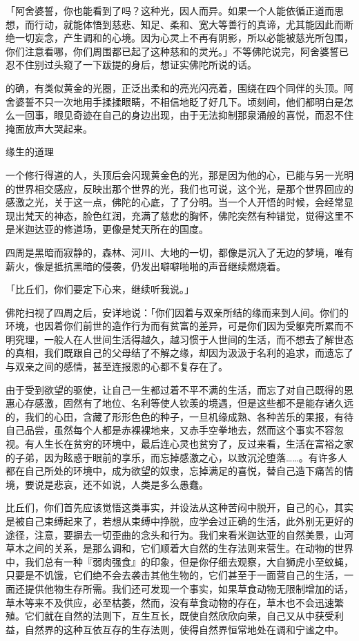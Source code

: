 \documentclass[12pt,twoside,openany]{book}
\begin{document}
「阿舍婆誓，你也能看到了吗？这种光，因人而异。如果一个人能依循正道而思想，而行动，就能体悟到慈悲、知足、柔和、宽大等善行的真谛，尤其能因此而断绝一切妄念，产生调和的心境。因为心灵上不再有阴影，所以必能被慈光所包围，你们注意看哪，你们周围都已起了这种慈和的灵光。」不等佛陀说完，阿舍婆誓已忍不住别过头窥了一下跋提的身后，想证实佛陀所说的话。

的确，有类似黄金的光圈，正泛出柔和的亮光闪亮着，围绕在四个同伴的头顶。阿舍婆誓不只一次地用手揉揉眼睛，不相信地眨了好几下。顷刻间，他们都明白是怎么一回事，眼见奇迹在自己的身边出现，由于无法抑制那泉涌般的喜悦，而忍不住掩面放声大哭起来。

缘生的道理

一个修行得道的人，头顶后会闪现黄金色的光，那是因为他的心，已能与另一光明的世界相交感应，反映出那个世界的光，我们也可说，这个光，是那个世界回应的感激之光，关于这一点，佛陀的心底，了了分明。当一个人开悟的时候，会经常显现出梵天的神态，脸色红润，充满了慈悲的胸怀，佛陀突然有种错觉，觉得这里不是米迦达亚的修道场，更像是梵天所在的国度。

四周是黑暗而寂静的，森林、河川、大地的一切，都像是沉入了无边的梦境，唯有薪火，像是抵抗黑暗的侵袭，仍发出噼噼啪啪的声音继续燃烧着。

「比丘们，你们要定下心来，继续听我说。」

佛陀扫视了四周之后，安详地说：「你们因着与双亲所结的缘而来到人间。你们的环境，也因着你们前世的造作行为而有贫富的差异，可是你们因为受躯壳所累而不明究理，一般人在人世间生活得越久，越习惯于人世间的生活，而不想去了解世态的真相，我们既跟自己的父母结了不解之缘，却因为汲汲于名利的追求，而遗忘了与双亲之间的感情，甚至连报恩的心都不复存在了。

由于受到欲望的驱使，让自己一生都过着不平不满的生活，而忘了对自己既得的恩惠心存感激，固然有了地位、名利等使人钦羡的境遇，但是这些都不是能存诸久远的，我们的心田，含藏了形形色色的种子，一旦机缘成熟、各种苦乐的果报，有待自己品尝，虽然每个人都是赤裸裸地来，又赤手空拳地去，然而这个事实不容忽视。有人生长在贫穷的环境中，最后连心灵也贫穷了，反过来看，生活在富裕之家的子弟，因为眩惑于眼前的享乐，而忘掉感激之心，以致沉沦堕落……。有许多人都在自己所处的环境中，成为欲望的奴隶，忘掉满足的喜悦，替自己造下痛苦的情境，要说是悲哀，还不如说，人类是多么愚蠢。

比丘们，你们首先应该觉悟这类事实，并设法从这种苦闷中脱开，自己的心，其实是被自己束缚起来了，若想从束缚中挣脱，应学会过正确的生活，此外别无更好的途径，注意，要摒去一切歪曲的念头和行为。我们来看米迦达亚的自然美景，山河草木之间的关系，是那么调和，它们顺着大自然的生存法则来营生。在动物的世界中，我们总有一种『弱肉强食』的印象，但是你仔细去观察，大自狮虎小至蚊蝇，只要是不饥饿，它们绝不会去袭击其他生物的，它们甚至于一面营自己的生活，一面还提供他物生存所需。我们还可发现一个事实，如果草食动物无限制增加的话，草木等来不及供应，必至枯萎，然而，没有草食动物的存在，草木也不会迅速繁殖。它们就在自然的法则下，互生互长，既使自然欣欣向荣，自己又从中获受利益，自然界的这种互依互存的生存法则，使得自然界恒常地处在调和宁谧之中。
\end{document}
